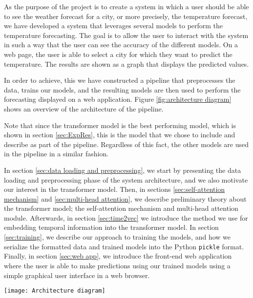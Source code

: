 As the purpose of the project is to create a system in which a user should be able to see the weather forecast for a city, or more precisely, the temperature forecast, we have developed a system that leverages several models to perform the temperature forecasting. 
The goal is to allow the user to interact with the system in such a way that the user can see the accuracy of the different models. 
On a web page, the user is able to select a city for which they want to predict the temperature.
The results are shown as a graph that displays the predicted values.

In order to achieve, this we have constructed a pipeline that preprocesses the data, trains our models, and the resulting models are then used to perform the forecasting displayed on a web application. 
Figure \ref{fig:architecture diagram} shows an overview of the architecture of the pipeline.

Note that since the transformer model is the best performing model, which is shown in section \ref{sec:ExpRes}, this is the model that we chose to include and describe as part of the pipeline. Regardless of this fact, the other models are used in the pipeline in a similar fashion.

In section \ref{sec:data loading and preprocessing}, we start by presenting the data loading and preprocessing phase of the system architecture, and we also motivate our interest in the transformer model.
Then, in sections \ref{sec:self-attention mechanism} and \ref{sec:multi-head attention}, we describe preliminary theory about the transformer model; the self-attention mechanism and multi-head attention module. 
Afterwards, in section \ref{sec:time2vec} we introduce the method we use for embedding temporal information into the transformer model. 
In section \ref{sec:training}, we describe our approach to training the models, and how we serialize the formatted data and trained models into the Python \texttt{pickle} format.
Finally, in section \ref{sec:web app}, we introduce the front-end web application where the user is able to make predictions using our trained models using a simple graphical user interface in a web browser.



\begin{figure*}
	\centering
	\texttt{[image: Architecture diagram]}
	\caption{The architecture of the system pipeline.}
	\label{fig:architecture diagram}
\end{figure*}